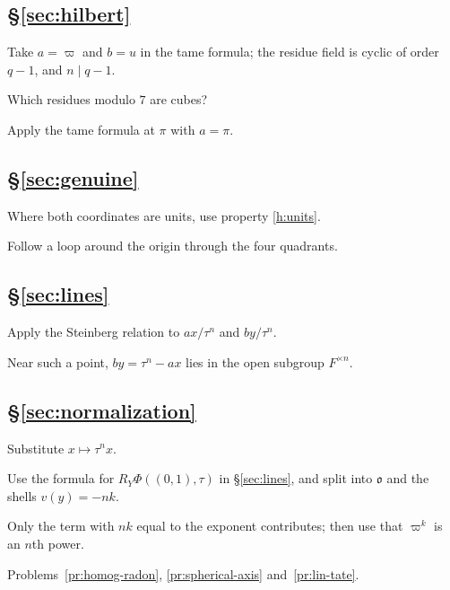 \documentclass[reqno]{amsart}
\newcommand{\oo}{\mathfrak{o}}
\numberwithin{equation}{section}
\theoremstyle{definition}
\theoremstyle{plain}
\newenvironment{hints}{\begin{description}[font=\normalfont\bfseries]}{\end{description}}
\begin{document}
\subsection*{\S\ref{sec:hilbert}}
\begin{hints}
\item[\ref{pr:hilb-tame}] Take $a = \varpi$ and $b = u$ in the tame formula; the residue field is cyclic of order $q - 1$, and $n \mid q - 1$.
\item[\ref{pr:hilb-q7}] Which residues modulo $7$ are cubes?
\item[\ref{pr:hilb-residue}] Apply the tame formula at $\pi$ with $a = \pi$.
\end{hints}

\subsection*{\S\ref{sec:genuine}}
\begin{hints}
\item[\ref{pr:gen-primitive}] Where both coordinates are units, use property \ref{h:units}.
\item[\ref{pr:gen-real}] Follow a loop around the origin through the four quadrants.
\end{hints}

\subsection*{\S\ref{sec:lines}}
\begin{hints}
\item[\ref{pr:lines-steinberg}] Apply the Steinberg relation to $a x / \tau^n$ and $b y / \tau^n$.
\item[\ref{pr:lines-continuity}] Near such a point, $b y = \tau^n - a x$ lies in the open subgroup $F^{\times n}$.
\end{hints}

\subsection*{\S\ref{sec:normalization}}
\begin{hints}
\item[\ref{pr:homog-radon}] Substitute $x \mapsto \tau^n x$.
\item[\ref{pr:spherical-axis}] Use the formula for $R_Y \Phi((0, 1), \tau)$ in \S\ref{sec:lines}, and split into $\oo$ and the shells $v(y) = -n k$.
\item[\ref{pr:basic-explicit}] Only the term with $n k$ equal to the exponent contributes; then use that $\varpi^{k}$ is an $n$th power.
\item[\ref{pr:forced}] Problems~\ref{pr:homog-radon}, \ref{pr:spherical-axis} and~\ref{pr:lin-tate}.
\end{hints}
\end{document}
